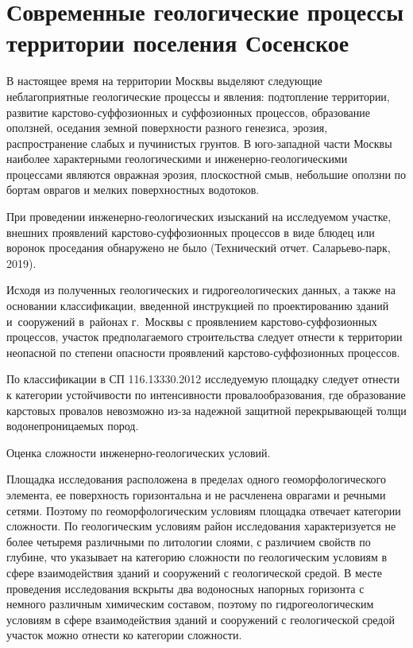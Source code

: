 \chapter{Современные геологические процессы территории поселения Сосенское}\label{ch:ch5}

В настоящее время на территории Москвы выделяют следующие неблагоприятные геологические процессы и явления: 
подтопление территории, развитие карстово-суффозионных и суффозионных процессов, образование оползней, 
оседания земной поверхности разного генезиса, эрозия, распространение слабых и пучинистых грунтов. 
В юго-западной части Москвы наиболее характерными геологическими и инженерно-геологическими процессами 
являются овражная эрозия, плоскостной смыв, небольшие оползни по бортам оврагов и мелких поверхностных водотоков.

При проведении инженерно-геологических изысканий на исследуемом участке, внешних проявлений карстово-суффозионных 
процессов в виде блюдец или воронок проседания обнаружено 
не было (Технический отчет. Саларьево-парк, 2019).

Исходя из полученных геологических и гидрогеологических данных, а также на основании классификации, 
введенной инструкцией по проектированию зданий и~сооружений в~районах г.~Москвы с проявлением 
карстово-суффозионных процессов, участок предполагаемого строительства следует отнести к территории 
неопасной по степени опасности проявлений карстово-суффозионных процессов.

По классификации в СП 116.13330.2012 исследуемую площадку следует отнести
 к  категории устойчивости 
по интенсивности провалообразования, где образование карстовых провалов невозможно 
из-за надежной защитной перекрывающей толщи водонепроницаемых пород.

Оценка сложности инженерно-геологических условий. 

Площадка исследования расположена в пределах одного геоморфологического элемента, ее поверхность 
горизонтальна и не расчленена оврагами и речными сетями. 
Поэтому по геоморфологическим условиям площадка отвечает  категории сложности. 
По геологическим условиям район исследования характеризуется не более четыремя различными по литологии слоями, 
с различием свойств по глубине, что указывает на  
категорию сложности по геологическим условиям в сфере взаимодействия 
зданий и сооружений с геологической средой. 
В месте проведения исследования вскрыты два водоносных напорных горизонта с немного 
различным химическим составом, поэтому по гидрогеологическим 
условиям  в сфере взаимодействия зданий и сооружений с геологической 
средой участок можно отнести ко  категории сложности. 

